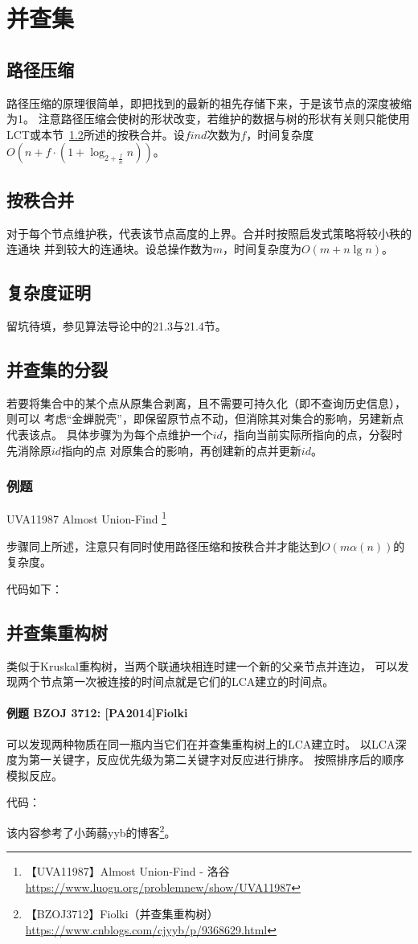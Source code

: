\section{并查集}\label{DSU}
\subsection{路径压缩}
路径压缩的原理很简单，即把找到的最新的祖先存储下来，于是该节点的深度被缩为1。
注意路径压缩会使树的形状改变，若维护的数据与树的形状有关则只能使用
LCT或本节~\ref{RankMerge}所述的按秩合并。设$find$次数为$f$，时间复杂度
$O(n+f\cdot (1+\log_{2+\frac{f}{n}}n))$。
\subsection{按秩合并}\label{RankMerge}
对于每个节点维护秩，代表该节点高度的上界。合并时按照启发式策略将较小秩的连通块
并到较大的连通块。设总操作数为$m$，时间复杂度为$O(m+n\lg n)$。
\subsection{复杂度证明}
留坑待填，参见算法导论\cite{ITA3}中的21.3与21.4节。
\subsection{并查集的分裂}
若要将集合中的某个点从原集合剥离，且不需要可持久化（即不查询历史信息），则可以
考虑``金蝉脱壳''，即保留原节点不动，但消除其对集合的影响，另建新点代表该点。
具体步骤为为每个点维护一个$id$，指向当前实际所指向的点，分裂时先消除原$id$指向的点
对原集合的影响，再创建新的点并更新$id$。

\subsubsection{例题}

UVA11987 Almost Union-Find \footnote{
    【UVA11987】Almost Union-Find - 洛谷
    \url{https://www.luogu.org/problemnew/show/UVA11987}}

步骤同上所述，注意只有同时使用路径压缩和按秩合并才能达到$O(m\alpha(n))$的复杂度。

代码如下：


\subsection{并查集重构树}
类似于Kruskal重构树，当两个联通块相连时建一个新的父亲节点并连边，
可以发现两个节点第一次被连接的时间点就是它们的LCA建立的时间点。

\paragraph{例题 BZOJ 3712: [PA2014]Fiolki}

可以发现两种物质在同一瓶内当它们在并查集重构树上的LCA建立时。
以LCA深度为第一关键字，反应优先级为第二关键字对反应进行排序。
按照排序后的顺序模拟反应。

代码：


该内容参考了小蒟蒻yyb的博客\footnote{
    【BZOJ3712】Fiolki（并查集重构树）
    \url{https://www.cnblogs.com/cjyyb/p/9368629.html}
}。
